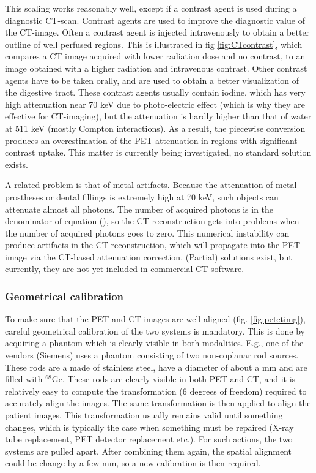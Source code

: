 This scaling works reasonably well, except if a contrast agent is used
during a diagnostic CT-scan. Contrast agents are used to improve the
diagnostic value of the CT-image. Often a contrast agent is injected
intravenously to obtain a better outline of well perfused
regions. This is illustrated in fig \ref{fig:CTcontrast}, which
compares a CT image acquired with lower radiation dose and no
contrast, to an image obtained with a higher radiation and intravenous
contrast. Other contrast agents have to be taken orally, and are used
to obtain a better visualization of the digestive tract. These
contrast agents usually contain iodine, which has very high
attenuation near 70 keV due to photo-electric effect (which is why
they are effective for CT-imaging), but the attenuation is hardly
higher than that of water at 511 keV (mostly Compton interactions). As
a result, the piecewise conversion produces an overestimation of the
PET-attenuation in regions with significant contrast uptake. This
matter is currently being investigated, no standard solution exists.

A related problem is that of metal artifacts. Because the attenuation
of metal prostheses or dental fillings is extremely high at 70 keV,
such objects can attenuate almost all photons. The number of acquired
photons is in the denominator of equation (), so the
CT-reconstruction gets into problems when the number of acquired
photons goes to zero. This numerical instability can produce artifacts
in the CT-reconstruction, which will propagate into the PET image via
the CT-based attenuation correction. (Partial) solutions exist, but
currently, they are not yet included in commercial CT-software.

\subsubsection{Geometrical calibration}
To make sure that the PET and CT images are well aligned
(fig. \ref{fig:petctimg}), careful geometrical calibration of the two
systems is mandatory. This is done by acquiring a phantom which is
clearly visible in both modalities. E.g., one of the vendors (Siemens)
uses a phantom consisting of two non-coplanar rod sources. These rods
are a made of stainless steel, have a diameter of about a mm and are
filled with $^{68}$Ge. These rods are clearly visible in both PET and
CT, and it is relatively easy to compute the transformation (6 degrees
of freedom) required to accurately align the images. The same
transformation is then applied to align the patient images. This
transformation usually remains valid until something changes, which is
typically the case when something must be repaired (X-ray tube
replacement, PET detector replacement etc.). For such actions, the two
systems are pulled apart. After combining them again, the spatial
alignment could be change by a few mm, so a new calibration is then
required.

